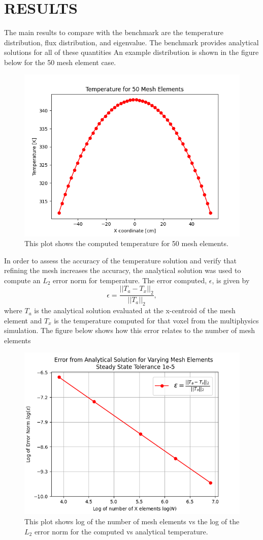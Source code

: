 \documentclass[letterpaper]{mc2023}
\begin{document}
\section{RESULTS}\label{sec:results}
The main results to compare with the benchmark are the temperature distribution, flux distribution, and eigenvalue. The benchmark provides
analytical solutions for all of these quantities An example distribution is shown in the figure below for the 50 mesh element case.
\begin{figure}
    \centering
    \includegraphics[width=0.55\linewidth]{figures/temp_50.png}
    \caption{This plot shows the computed temperature for 50 mesh elements.}
    \label{fig:temp50}
\end{figure}
In order to assess the accuracy of the temperature solution and verify that refining the mesh increases the accuracy, the analytical solution
was used to compute an $L_{2}$ error norm for temperature. The error computed, $\epsilon$, is given by
\begin{equation}
    \epsilon = \frac{|| T_{a} - T_{x} ||_{2}}{|| T_{a} ||_{2}},
\end{equation}
where $T_{a}$ is the analytical solution evaluated at the x-centroid of the mesh element and $T_{x}$ is the temperature computed for that
voxel from the multiphysics simulation. The figure below shows how this error relates to the number of mesh elements
\begin{figure}[H]
    \centering
    \includegraphics[width=0.55\linewidth]{figures/error_study.png}
    \caption{This plot shows log of the number of mesh elements vs the log of the $L_{2}$ error norm for the computed vs analytical temperature.}
    \label{fig:error_study}
\end{figure}
\end{document}
